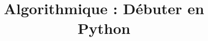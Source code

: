 		
		\newcommand{\exclure}[1]{\renewenvironment{#1}{\begingroup\comment}{\endcomment\endgroup\ignorespaces}}
		
		
		
		
		\exclure{details} \exclure{bareme} \exclure{sujet} \exclure{notabene} \exclure{exercicecorrection}
		
		
		
		
			\title{Algorithmique : Débuter en Python}
			\date{}
			
